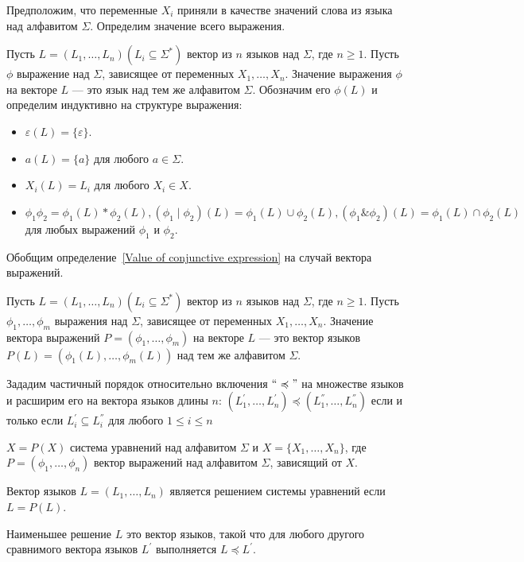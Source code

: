 Предположим, что переменные $X_i$ приняли в качестве значений слова из языка над алфавитом $\Sigma$. Определим значение всего выражения.

\begin{definition}\label{Value of conjunctive expression}
    Пусть $L = (L_1,\ldots,L_n) (L_i \subseteq \Sigma^*)$ вектор из $n$ языков над $\Sigma$, где $n \geqslant 1$. Пусть $\phi$ выражение над $\Sigma$, зависящее от переменных $X_1,\ldots,X_n$. Значение выражения $\phi$ на векторе $L$ --- это язык над тем же алфавитом $\Sigma$. Обозначим его $\phi(L)$ и определим индуктивно на структуре выражения:
    \begin{itemize}
	   \item $\varepsilon(L) = \{\varepsilon\}$.
	   \item $a(L) = \{a\}$ для любого $a\in\Sigma$.
	   \item $X_i(L) = L_i$ для любого $X_i \in X$.
	   \item $\phi_1\phi_2 = \phi_1(L) * \phi_2(L), (\phi_1\mid\phi_2)(L) = \phi_1(L) \cup \phi_2(L), (\phi_1\&\phi_2)(L) = \phi_1(L) \cap \phi_2(L)$ для любых выражений $\phi_1$ и $\phi_2$.
	\end{itemize}
\end{definition}

Обобщим определение~\ref{Value of conjunctive expression} на случай вектора выражений.

\begin{definition}
    Пусть $L = (L_1,\ldots,L_n) (L_i \subseteq \Sigma^*)$ вектор из $n$ языков над $\Sigma$, где $n \geqslant 1$. Пусть $\phi_1,\ldots,\phi_m$ выражения над $\Sigma$, зависящее от переменных $X_1,\ldots,X_n$. Значение вектора выражений $P = (\phi_1,\ldots,\phi_m)$ на векторе $L$ --- это вектор языков $P(L) = (\phi_1(L),\ldots,\phi_m(L))$ над тем же алфавитом $\Sigma$. 
\end{definition}

Зададим частичный порядок относительно включения $``\preccurlyeq"$ на множестве языков и расширим его на вектора языков длины $n$: $(L_1^{'},\ldots,L_n^{'})\preccurlyeq(L_1^{''},\ldots,L_n^{''})$ если и только если $L_i^{'} \subseteq L_i^{''}$ для любого $1\leqslant i \leqslant n$

\begin{definition}\label{Definition a conjuctive system of equations}
   $X = P(X)$ система уравнений над алфавитом $\Sigma$ и $X = \{X_1,\ldots,X_n\}$, где $P = (\phi_1,\ldots,\phi_n)$ вектор выражений над алфавитом $\Sigma$, зависящий от $X$.
   
   Вектор языков $L = (L_1,\ldots,L_n)$ является решением системы уравнений если $L = P(L)$.
   
   Наименьшее решение $L$ это вектор языков, такой что для любого другого сравнимого вектора языков $L^{'}$ выполняется $L \preccurlyeq L^{'}$.
\end{definition}

